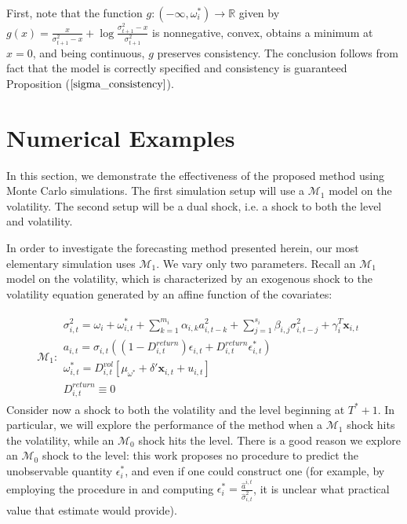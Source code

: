 \documentclass[11pt,3p,review,authoryear]{elsarticle}
\newcommand{\x}{\textbf{x}}
\def\mbf#1{\mathbf{#1}} %
\def\mc#1{\mathcal{#1}} %
\def\mc#1{\mathcal{#1}}
\theoremstyle{definition}
\newenvironment{proof-of-proposition}[1][{}]{\noindent{\bf
    Proof of Proposition {#1}}
  \hspace*{.5em}}{\qed\bigskip\\}
\begin{document}
\begin{proof-of-proposition}
  First, note that the function $g:(-\infty,\omega_{i}^{*})\rightarrow \mathbb{R}$ given by $g(x) = \frac{x}{\sigma^{2}_{t+1}-x} + \log{\frac{\sigma_{t+1}^{2}-x}{\sigma_{t+1}^{2}} }$ is nonnegative, convex, obtains a minimum at $x = 0$, and being continuous, $g$ preserves consistency. The conclusion follows from fact that the model is correctly specified and consistency is guaranteed Proposition ($\ref{sigma_consistency}$). 
  
\end{proof-of-proposition}

\section{Numerical Examples}

In this section, we demonstrate the effectiveness of the proposed method using Monte Carlo simulations.  The first simulation setup will use a $\mc{M}_{1}$ model on the volatility.  The second setup will be a dual shock, i.e. a shock to both the level and volatility.

In order to investigate the forecasting method presented herein, our most elementary simulation uses $\mc{M}_1$.  We vary only two parameters.  Recall an $\mc{M}_1$ model on the volatility, which is characterized by an exogenous shock to the volatility equation generated by an affine function of the covariates:

\begin{align*}
  \mc{M}_1 \colon \begin{array}{l}
     \sigma^{2}_{i,t} = \omega_{i} + \omega^{*}_{i,t} + \sum^{m_{i}}_{k=1}\alpha_{i,k}a^{2}_{i,t-k} + \sum_{j=1}^{s_{i}}\beta_{i,j}\sigma_{i,t-j}^{2} + \gamma_{i}^{T} \x_{i,t} \text{ }\\[.2cm]
     a_{i,t} = \sigma_{i,t}((1-D^{return}_{i,t})\epsilon_{i,t} + D^{return}_{i,t}\epsilon^{*}_{i,t})\\[.2cm]
    \omega_{i,t}^{*} = D^{vol}_{i,t}[\mu_{\omega^{*}}+\delta'\mbf{x}_{i, t}+ u_{i,t}]\\[.2cm]
    D^{return}_{i,t} \equiv 0
  \end{array}
  \end{align*}
Consider now a shock to both the volatility and the level beginning at $T^{*}+1$.  In particular, we will explore the performance of the method when a  $\mc{M}_{1}$ shock hits the volatility, while an $\mc{M}_{0}$ shock hits the level. There is a good reason we explore an $\mc{M}_{0}$ shock to the level: this work proposes no procedure to predict the unobservable quantity $\epsilon^{*}_{i}$, and even if one could construct one (for example, by employing the procedure in \cite{lin2021minimizing} and computing $\epsilon^{*}_{i} = \frac{\hat a^{i,t}}{\hat\sigma^2_{i,t}}$, it is unclear what practical value that estimate would provide).
\end{document}
